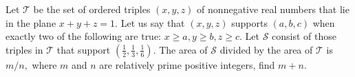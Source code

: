 Let $\mathcal{T}$ be the set of ordered triples $(x,y,z)$ of nonnegative real numbers that lie in the plane $x+y+z=1.$  Let us say that $(x,y,z)$ supports $(a,b,c)$ when exactly two of the following are true: $x\ge a, y\ge b, z\ge c.$  Let $\mathcal{S}$ consist of those triples in $\mathcal{T}$ that support $\left(\frac 12,\frac 13,\frac 16\right).$  The area of $\mathcal{S}$ divided by the area of $\mathcal{T}$ is $m/n,$  where $m$ and $n$ are relatively prime positive integers, find $m+n.$